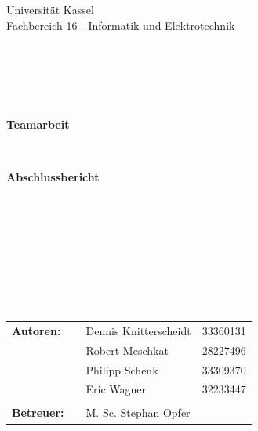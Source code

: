 \documentclass[a4paper,12pt,headsepline]{scrartcl}
\begin{document}
	
	\begin{verbatim}
	
	
	\end{verbatim}
	
	\begin{center}
		\Large{Universität Kassel}\\
		\Large{Fachbereich 16 - Informatik und Elektrotechnik}\\
	\end{center}
	
	
	\begin{verbatim}
	
	
	
	
	\end{verbatim}
	\begin{center}
		\doublespacing
		\textbf{\LARGE{Teamarbeit}}\\
		\singlespacing
		\begin{verbatim}
		
		\end{verbatim}
		\textbf{Abschlussbericht}
	\end{center}
	\begin{verbatim}
	
	\end{verbatim}
	\begin{center}
		
	\end{center}
	\begin{verbatim}
	
	\end{verbatim}
	\begin{center}
		
	\end{center}
	\begin{verbatim}
	
	
	
	
	\end{verbatim}
	\begin{flushleft}
		\begin{tabular}{llll}
			\textbf{Autoren:} & & Dennis Knitterscheidt & 33360131 \\
			& & Robert Meschkat & 28227496\\
			& & Philipp Schenk & 33309370\\
			& & Eric Wagner & 32233447\\ \\
			\textbf{Betreuer:} & & M. Sc. Stephan Opfer &\\
		\end{tabular}
	\end{flushleft}
	\newpage
	
\end{document}
